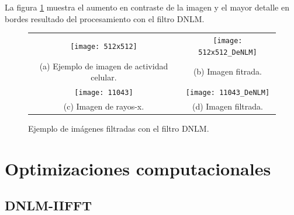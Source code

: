 La figura \ref{fig:exampleDNLM} muestra el aumento en contraste de la imagen y el mayor detalle en bordes resultado del procesamiento con el filtro DNLM.

\begin{figure}[htb]
\centering
\begin{tabular}{cc}
  \texttt{[image: 512x512]} &
  \texttt{[image: 512x512\_DeNLM]} \\
  (a) Ejemplo de imagen de actividad celular. &
  (b) Imagen fitrada. \\
  \texttt{[image: 11043]} &
  \texttt{[image: 11043\_DeNLM]} \\
  (c) Imagen de rayos-x. &
  (d) Imagen filtrada. 
\end{tabular}
%
%
\caption[Ejemplo de im\'agenes filtradas con el filtro DNLM]{Ejemplo de im\'agenes filtradas con el filtro DNLM. \label{fig:exampleDNLM}}

%
\end{figure}



\section{Optimizaciones computacionales}
\label{ch:marco_opt}

\subsection{DNLM-IIFFT}
\label{ch:marco_dnlmifft}

